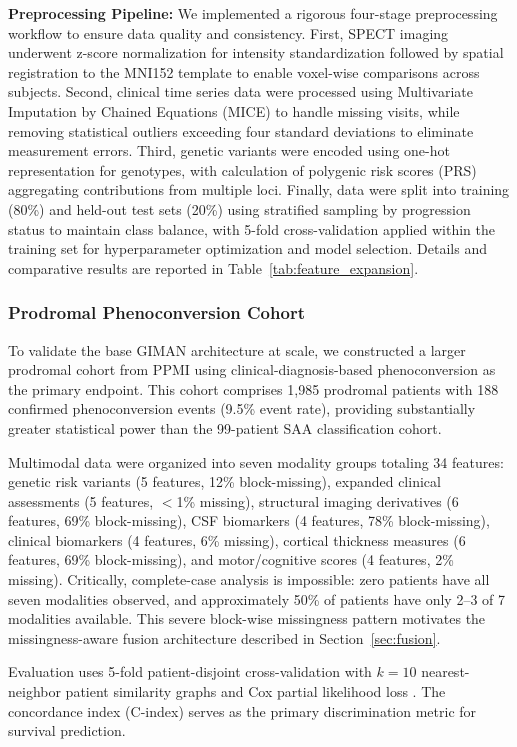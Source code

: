 \documentclass[journal,twoside,web]{ieeecolor}
\begin{document}
\textbf{Preprocessing Pipeline:} We implemented a rigorous four-stage preprocessing workflow to ensure data quality and consistency. First, SPECT imaging underwent z-score normalization for intensity standardization followed by spatial registration to the MNI152 template to enable voxel-wise comparisons across subjects. Second, clinical time series data were processed using Multivariate Imputation by Chained Equations (MICE) to handle missing visits, while removing statistical outliers exceeding four standard deviations to eliminate measurement errors. Third, genetic variants were encoded using one-hot representation for genotypes, with calculation of polygenic risk scores (PRS) aggregating contributions from multiple loci. Finally, data were split into training (80\%) and held-out test sets (20\%) using stratified sampling by progression status to maintain class balance, with 5-fold cross-validation applied within the training set for hyperparameter optimization and model selection. Details and comparative results are reported in Table~\ref{tab:feature_expansion}.

\subsubsection{Prodromal Phenoconversion Cohort}
To validate the base GIMAN architecture at scale, we constructed a larger prodromal cohort from PPMI using clinical-diagnosis-based phenoconversion as the primary endpoint. This cohort comprises 1{,}985 prodromal patients with 188 confirmed phenoconversion events (9.5\% event rate), providing substantially greater statistical power than the 99-patient SAA classification cohort.

Multimodal data were organized into seven modality groups totaling 34 features: genetic risk variants (5 features, 12\% block-missing), expanded clinical assessments (5 features, $<$1\% missing), structural imaging derivatives (6 features, 69\% block-missing), CSF biomarkers (4 features, 78\% block-missing), clinical biomarkers (4 features, 6\% missing), cortical thickness measures (6 features, 69\% block-missing), and motor/cognitive scores (4 features, 2\% missing). Critically, complete-case analysis is impossible: zero patients have all seven modalities observed, and approximately 50\% of patients have only 2--3 of 7 modalities available. This severe block-wise missingness pattern motivates the missingness-aware fusion architecture described in Section~\ref{sec:fusion}.

Evaluation uses 5-fold patient-disjoint cross-validation with $k=10$ nearest-neighbor patient similarity graphs and Cox partial likelihood loss \cite{katzman2018deepsurv}. The concordance index (C-index) \cite{harrell1996multivariable} serves as the primary discrimination metric for survival prediction.
\end{document}
